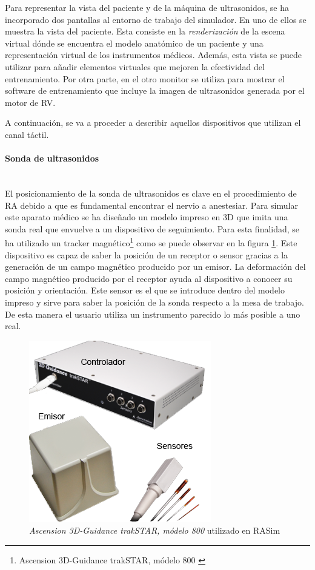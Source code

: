 Para representar la vista del paciente y de la máquina de ultrasonidos, se ha incorporado dos pantallas al entorno de trabajo del simulador. 
En uno de ellos se muestra la vista del paciente. Esta consiste en la \emph{renderización} de la escena virtual dónde se encuentra el modelo anatómico de un paciente y una representación virtual de los instrumentos médicos. Además, esta vista se puede utilizar para añadir elementos virtuales que mejoren la efectividad del entrenamiento. 
Por otra parte, en el otro monitor se utiliza para mostrar el software de entrenamiento que incluye la imagen de ultrasonidos generada por el motor de \ac{RV}.

A continuación, se va a proceder a describir aquellos dispositivos que utilizan el canal táctil. 

\paragraph{Sonda de ultrasonidos}\mbox{}\\

El posicionamiento de la sonda de ultrasonidos es clave en el procedimiento de \ac{RA} debido a que es fundamental encontrar el nervio a anestesiar. Para simular este aparato médico se ha diseñado un modelo impreso en 3D que imita una sonda real que envuelve a un dispositivo de seguimiento. Para esta finalidad, se ha utilizado un \ac{tracker} magnético\footnote{ Ascension 3D-Guidance trakSTAR, módelo 800 \cite{Ascension}} como se puede observar en la figura \ref{fig:tracker}. 
Este dispositivo es capaz de saber la posición de un receptor o sensor gracias a la generación de un campo magnético producido por un emisor. La deformación del campo magnético producido por el receptor ayuda al dispositivo a conocer su posición y orientación. Este sensor es el que se introduce dentro del modelo impreso y sirve para saber la posición de la sonda respecto a la mesa de trabajo. De esta manera el usuario utiliza un instrumento parecido lo más posible a uno real.

\begin{figure}[h]
    \centering
    \includegraphics{IMG/tracker.png}
    \caption{\emph{Ascension 3D-Guidance trakSTAR, módelo 800} \cite{Ascension} utilizado en \ac{RASim}}
    \label{fig:tracker}
\end{figure}

